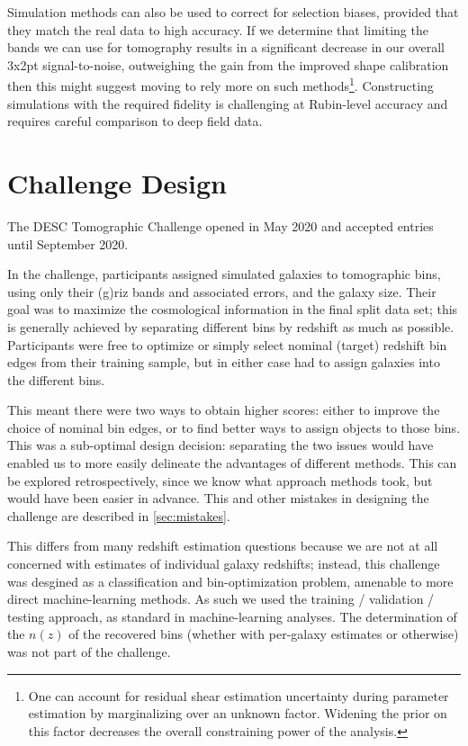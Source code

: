 \documentclass[twocolumn,twocolappendix]{aastex63}
\begin{document}
Simulation methods can also be used to correct for selection biases, provided that they match the
real data to high accuracy.  If we determine that limiting the bands we can use for tomography results
in a significant decrease in our overall 3x2pt signal-to-noise, outweighing the gain from the improved shape
calibration then this might suggest moving to rely more on such methods\footnote{One can account for
residual shear estimation uncertainty during parameter estimation by marginalizing over an unknown
factor.  Widening the prior on this factor decreases the overall constraining power of the analysis.}.
Constructing simulations with the required fidelity is challenging at Rubin-level accuracy and requires
careful comparison to deep field data.


\section{Challenge Design} \label{sec:design}

The DESC Tomographic Challenge opened in May 2020 and accepted entries until September 2020.

In the challenge, participants assigned simulated galaxies to tomographic bins,
using only their (g)riz bands and associated errors, and the galaxy size.  Their goal was to maximize the cosmological
information in the final split data set; this is generally achieved by separating different bins by 
redshift as much as possible.  Participants were free to optimize or simply select nominal (target) 
redshift bin edges from their training sample, but in either case had to assign galaxies into the 
different bins.

This meant there were two ways to obtain higher scores: either to improve the choice of nominal bin
edges, or to find better ways to assign objects to those bins.  This was a sub-optimal design decision:
separating the two issues would have enabled us to more easily delineate the advantages of different methods. 
This can be explored retrospectively, since we know what approach methods took, but would have been
easier in advance.  This and other mistakes in designing the challenge are described in \autoref{sec:mistakes}.

This differs from many redshift estimation questions because we are not at all concerned with estimates
of individual galaxy redshifts; instead, this challenge was desgined as a classification and bin-optimization
problem, amenable to more direct machine-learning methods.  As such we used the training / validation / testing
approach, as standard in machine-learning analyses.
The determination of the $n(z)$ of the recovered
bins (whether with per-galaxy estimates or otherwise) was not part of the challenge.
\end{document}
